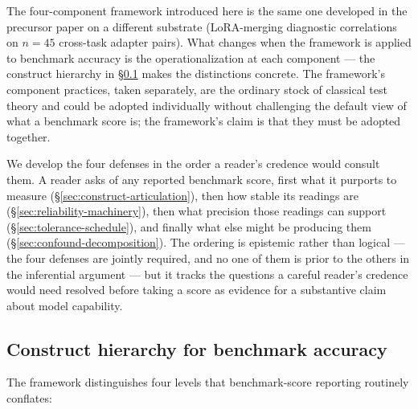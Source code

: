 \documentclass[11pt]{article}
\begin{document}
The four-component framework introduced here is the same one
developed in the precursor paper \citep{anonymized2026n134} on a
different substrate (LoRA-merging diagnostic correlations on
$n = 45$ cross-task adapter pairs). What changes when the framework
is applied to benchmark accuracy is the operationalization at each
component --- the construct hierarchy in §\ref{sec:construct-hierarchy}
makes the distinctions concrete. The framework's component
practices, taken separately, are the ordinary stock of classical
test theory and could be adopted individually without challenging
the default view of what a benchmark score is; the framework's
claim is that they must be adopted together.

We develop the four defenses in the order a reader's credence would
consult them. A reader asks of any reported benchmark score, first
what it purports to measure (§\ref{sec:construct-articulation}),
then how stable its readings are (§\ref{sec:reliability-machinery}),
then what precision those readings can support
(§\ref{sec:tolerance-schedule}), and finally what else might be
producing them (§\ref{sec:confound-decomposition}). The ordering is
epistemic rather than logical --- the four defenses are jointly
required, and no one of them is prior to the others in the
inferential argument --- but it tracks the questions a careful
reader's credence would need resolved before taking a score as
evidence for a substantive claim about model capability.

\subsection{Construct hierarchy for benchmark accuracy}
\label{sec:construct-hierarchy}


The framework distinguishes four levels that benchmark-score reporting routinely conflates:
\end{document}
